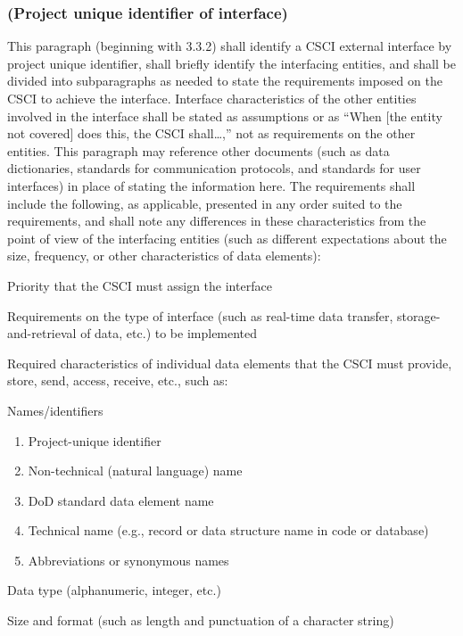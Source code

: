 \subsubsection{(Project unique identifier of interface)}

This paragraph (beginning with 3.3.2) shall identify a CSCI external
interface by project unique identifier, shall briefly identify the
interfacing entities, and shall be divided into subparagraphs as needed
to state the requirements imposed on the CSCI to achieve the interface.
Interface characteristics of the other entities involved in the
interface shall be stated as assumptions or as ``When {[}the entity not
covered{]} does this, the CSCI shall\ldots{},'' not as requirements on
the other entities. This paragraph may reference other documents (such
as data dictionaries, standards for communication protocols, and
standards for user interfaces) in place of stating the information here.
The requirements shall include the following, as applicable, presented
in any order suited to the requirements, and shall note any differences
in these characteristics from the point of view of the interfacing
entities (such as different expectations about the size, frequency, or
other characteristics of data elements):

Priority that the CSCI must assign the interface

Requirements on the type of interface (such as real-time data transfer,
storage-and-retrieval of data, etc.) to be implemented

Required characteristics of individual data elements that the CSCI must
provide, store, send, access, receive, etc., such as:

Names/identifiers

\begin{enumerate}
\itemsep1pt\parskip0pt
\item
  Project-unique identifier
\item
  Non-technical (natural language) name
\item
  DoD standard data element name
\item
  Technical name (e.g., record or data structure name in code or
  database)
\item
  Abbreviations or synonymous names
\end{enumerate}

Data type (alphanumeric, integer, etc.)

Size and format (such as length and punctuation of a character string)

